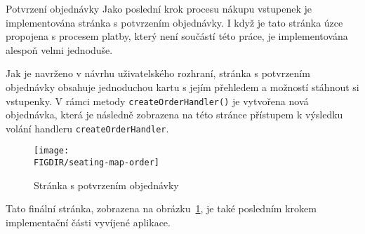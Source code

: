 \begin{subsection}{Potvrzení objednávky}
    \label{subsec:implementace-checkout-order-confirmation}
    Jako poslední krok procesu nákupu vstupenek je implementována stránka s potvrzením objednávky.
    I když je tato stránka úzce propojena s procesem platby, který není součástí této práce, je implementována alespoň velmi jednoduše.

    Jak je navrženo v návrhu uživatelského rozhraní, stránka s potvrzením objednávky obsahuje jednoduchou kartu s jejím přehledem a možností stáhnout si vstupenky.
    V rámci metody \texttt{createOrderHandler()} je vytvořena nová objednávka, která je následně zobrazena na této stránce přístupem k výsledku volání handleru \texttt{createOrderHandler}.

    \begin{figure}[H]
        \centering
        \texttt{[image: \\FIGDIR/seating-map-order]}
        \caption{Stránka s potvrzením objednávky}
        \label{fig:seating-map-order}
    \end{figure}

    Tato finální stránka, zobrazena na obrázku~\ref{fig:seating-map-order}, je také posledním krokem implementační části vyvíjené aplikace.
\end{subsection}

